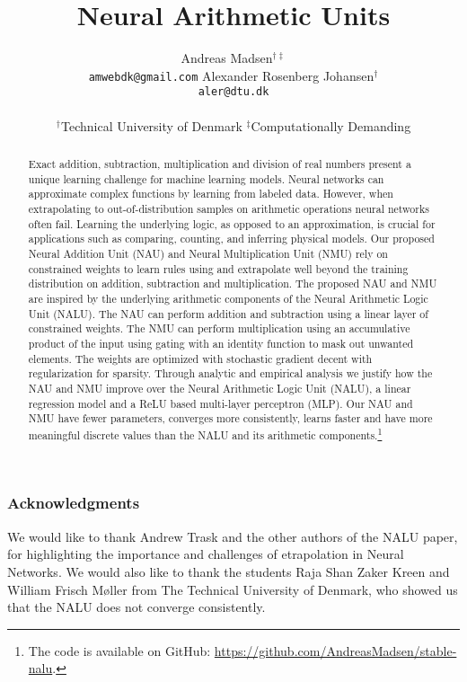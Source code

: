 \documentclass{article}
\title{Neural Arithmetic Units}
\author{%
  Andreas Madsen$^{\dag\ddag}$ \\
  \texttt{amwebdk@gmail.com}
  \AND
  Alexander Rosenberg Johansen$^{\dag}$ \\
  \texttt{aler@dtu.dk} \\
  \\
$^\dag$Technical University of Denmark \quad
$^\ddag$Computationally Demanding
}
\def\nonanonymous{}
\begin{document}
\maketitle

\begin{abstract}
Exact addition, subtraction, multiplication and division of real numbers present a unique learning challenge for machine learning models.
Neural networks can approximate complex functions by learning from labeled data.
However, when extrapolating to out-of-distribution samples on arithmetic operations neural networks often fail. Learning the underlying logic, as opposed to an approximation, is crucial for applications such as comparing, counting, and inferring physical models.
Our proposed Neural Addition Unit (NAU) and Neural Multiplication Unit (NMU) rely on constrained weights to learn rules using  and extrapolate well beyond the training distribution on addition, subtraction and multiplication.
The proposed NAU and NMU are inspired by the underlying arithmetic components of the Neural Arithmetic Logic Unit (NALU).
The NAU can perform addition and subtraction using a linear layer of constrained weights.
The NMU can perform multiplication using an accumulative product of the input using gating with an identity function to mask out unwanted elements.
The weights are optimized with stochastic gradient decent with regularization for sparsity.
Through analytic and empirical analysis we justify how the NAU and NMU improve over the Neural Arithmetic Logic Unit (NALU), a linear regression model and a ReLU based multi-layer perceptron (MLP).
Our NAU and NMU have fewer parameters, converges more consistently, learns faster and have more meaningful discrete values than the NALU and its arithmetic components.\ifdefined\nonanonymous\footnote{The code is available on GitHub: \url{https://github.com/AndreasMadsen/stable-nalu}.}\fi
\end{abstract}







\clearpage
\ifdefined\nonanonymous
\subsubsection*{Acknowledgments}
We would like to thank Andrew Trask and the other authors of the NALU paper, for highlighting the importance and challenges of etrapolation in Neural Networks. We would also like to thank the students Raja Shan Zaker Kreen and William Frisch Møller from The Technical University of Denmark, who showed us that the NALU does not converge consistently.
\fi




\newpage
\appendix

\clearpage

\clearpage

\clearpage
\end{document}
